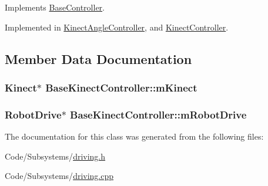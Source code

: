 \-Implements \hyperlink{class_base_controller_a2c73f08fa403e1a4912ce4aaa348ac61}{\-Base\-Controller}.



\-Implemented in \hyperlink{class_kinect_angle_controller_a530d70a40efe4bf2f9536e641805b137}{\-Kinect\-Angle\-Controller}, and \hyperlink{class_kinect_controller_a7252c3d29afaf83fa742925b2f23da0c}{\-Kinect\-Controller}.



\subsection{\-Member \-Data \-Documentation}
\hypertarget{class_base_kinect_controller_adb1473e11205509ac1b0b61ad29477ad}{
\subsubsection[{m\-Kinect}]{\setlength{\rightskip}{0pt plus 5cm}\-Kinect$\ast$ {\bf \-Base\-Kinect\-Controller\-::m\-Kinect}}}\label{class_base_kinect_controller_adb1473e11205509ac1b0b61ad29477ad}
\hypertarget{class_base_kinect_controller_a516661e146dae4762ed1a4cdbc626e24}{
\subsubsection[{m\-Robot\-Drive}]{\setlength{\rightskip}{0pt plus 5cm}\-Robot\-Drive$\ast$ {\bf \-Base\-Kinect\-Controller\-::m\-Robot\-Drive}}}\label{class_base_kinect_controller_a516661e146dae4762ed1a4cdbc626e24}


\-The documentation for this class was generated from the following files\-:\begin{DoxyCompactItemize}
\item 
\-Code/\-Subsystems/\hyperlink{driving_8h}{driving.\-h}\item 
\-Code/\-Subsystems/\hyperlink{driving_8cpp}{driving.\-cpp}\end{DoxyCompactItemize}
